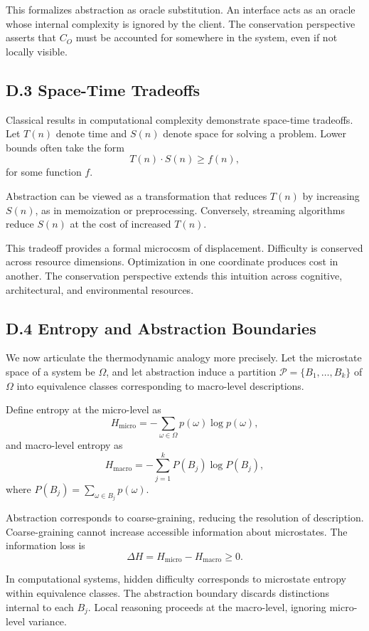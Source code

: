 \documentclass[11pt]{article}
\begin{document}
This formalizes abstraction as oracle substitution. An interface acts as an oracle whose internal complexity is ignored by the client. The conservation perspective asserts that $C_O$ must be accounted for somewhere in the system, even if not locally visible.

\subsection{D.3 Space-Time Tradeoffs}

Classical results in computational complexity demonstrate space-time tradeoffs. Let $T(n)$ denote time and $S(n)$ denote space for solving a problem. Lower bounds often take the form
\[
T(n) \cdot S(n) \geq f(n),
\]
for some function $f$.

Abstraction can be viewed as a transformation that reduces $T(n)$ by increasing $S(n)$, as in memoization or preprocessing. Conversely, streaming algorithms reduce $S(n)$ at the cost of increased $T(n)$.

This tradeoff provides a formal microcosm of displacement. Difficulty is conserved across resource dimensions. Optimization in one coordinate produces cost in another. The conservation perspective extends this intuition across cognitive, architectural, and environmental resources.

\subsection{D.4 Entropy and Abstraction Boundaries}

We now articulate the thermodynamic analogy more precisely. Let the microstate space of a system be $\Omega$, and let abstraction induce a partition $\mathcal{P} = \{B_1, \dots, B_k\}$ of $\Omega$ into equivalence classes corresponding to macro-level descriptions.

Define entropy at the micro-level as
\[
H_{\text{micro}} = - \sum_{\omega \in \Omega} p(\omega) \log p(\omega),
\]
and macro-level entropy as
\[
H_{\text{macro}} = - \sum_{j=1}^k P(B_j) \log P(B_j),
\]
where $P(B_j) = \sum_{\omega \in B_j} p(\omega)$.

Abstraction corresponds to coarse-graining, reducing the resolution of description. Coarse-graining cannot increase accessible information about microstates. The information loss is
\[
\Delta H = H_{\text{micro}} - H_{\text{macro}} \geq 0.
\]

In computational systems, hidden difficulty corresponds to microstate entropy within equivalence classes. The abstraction boundary discards distinctions internal to each $B_j$. Local reasoning proceeds at the macro-level, ignoring micro-level variance.
\end{document}
